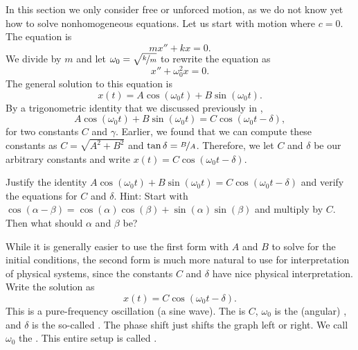\documentclass{ximera}
\begin{document}
In this section we only consider free or unforced motion, as we do not know yet how to solve nonhomogeneous equations.  Let us start with  motion where $c=0$.  The equation is
\begin{equation*}
    mx'' + kx = 0 .
\end{equation*}
We divide by $m$ and let $\omega_0 = \sqrt{\nicefrac{k}{m}}$ to rewrite the equation as
\begin{equation*}
    x'' + \omega_0^2 x = 0 .
\end{equation*}
The general solution to this equation is
\begin{equation*}
    x(t) = A \cos (\omega_0 t) + B \sin (\omega_0 t) .
\end{equation*}
By a trigonometric identity that we discussed previously in ,
\begin{equation*}
    A \cos (\omega_0 t) + B \sin (\omega_0 t) = C \cos ( \omega_0 t - \delta ) ,
\end{equation*}
for two constants $C$ and $\gamma$. Earlier, we found that we can compute these constants as $C= \sqrt{A^2 + B^2}$ and $\tan \delta = \nicefrac{B}{A}$.  Therefore, we let $C$ and $\delta$ be our arbitrary constants and write $x(t) = C \cos ( \omega_0 t - \delta )$.

\begin{exercise}
    Justify the identity $A \cos (\omega_0 t) + B \sin (\omega_0 t) = C \cos ( \omega_0 t - \delta )$ and verify the equations for $C$ and $\delta$.  Hint: Start with $\cos (\alpha-\beta) = \cos (\alpha) \cos (\beta) + \sin (\alpha)\sin (\beta)$ and multiply by $C$. Then what should $\alpha$ and $\beta$ be?
\end{exercise}

While it is generally easier to use the first form with $A$ and $B$ to solve for the initial conditions, the second form is much more natural to use for interpretation of physical systems, since the constants $C$ and $\delta$ have nice physical interpretation. Write the solution as
\begin{equation*}
    x(t) = C \cos ( \omega_0 t - \delta) .
\end{equation*}
This is a pure-frequency oscillation (a sine wave). The \emph{} is $C$, $\omega_0$ is the (angular) \emph{}, and $\delta$ is the so-called \emph{}. The phase shift just shifts the graph left or right. We call $\omega_0$ the \emph{}. This entire setup is called \emph{}.
\end{document}
